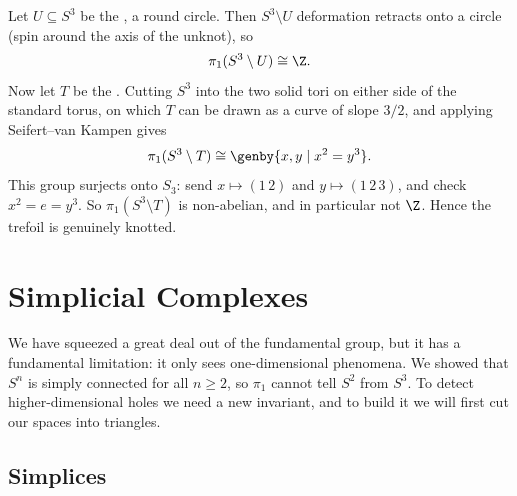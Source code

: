 \begin{example}
	Let $U \subseteq S^3$ be the , a round circle. Then $S^3 \setminus U$ deformation retracts onto a circle (spin around the axis of the unknot), so
	$$
	\pi_1(S^3\setminus U) \cong \Z.
	$$
	Now let $T$ be the . Cutting $S^3$ into the two solid tori on either side of the standard torus, on which $T$ can be drawn as a curve of slope $3/2$, and applying Seifert--van Kampen gives
	$$
	\pi_1(S^3 \setminus T) \cong \genby{x, y \mid x^2 = y^3}.
	$$
	This group surjects onto $S_3$: send $x \mapsto (1\,2)$ and $y \mapsto (1\,2\,3)$, and check $x^2 = e = y^3$. So $\pi_1(S^3\setminus T)$ is non-abelian, and in particular not $\Z$. Hence the trefoil is genuinely knotted.
\end{example}

\begin{center}
\end{center}

\section{Simplicial Complexes} \label{sec:simplicial}

We have squeezed a great deal out of the fundamental group, but it has a fundamental
limitation: it only sees one-dimensional phenomena. We showed that $S^n$ is simply
connected for all $n \geq 2$, so $\pi_1$ cannot tell $S^2$ from $S^3$. To detect
higher-dimensional holes we need a new invariant, and to build it we will first cut our
spaces into triangles.

\subsection{Simplices}

